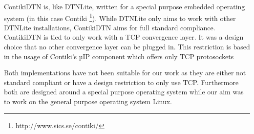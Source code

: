 ContikiDTN \cite{contikidtn} is, like DTNLite, written for a special purpose
embedded operating system (in this case Contiki
\footnote{http://www.sics.se/contiki/}). While DTNLite only aims to work with
other DTNLite installations, ContikiDTN aims for full standard compliance.
ContikiDTN is tied to only work with a TCP convergence layer. It was a design
choice that no other convergence layer can be plugged in. This restriction is based in
the usage of Contiki's µIP component which offers only TCP protosockets

Both implementations have not been suitable for our work as they are either not
standard compliant or have a design restriction to only use TCP. Furthermore both
are designed around a special purpose operating system while our aim was to work
on the general purpose operating system Linux.
